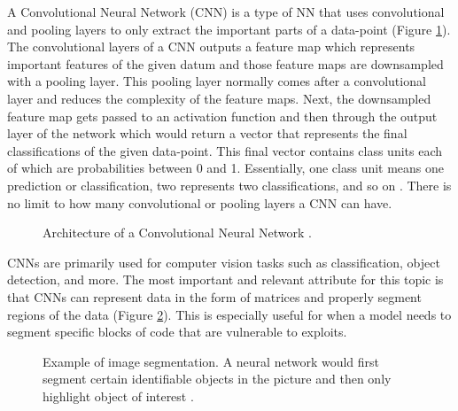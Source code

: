 \documentclass[12pt,twocolumn,letterpaper]{article}
\begin{document}
A Convolutional Neural Network (CNN) is a type of NN that uses convolutional and pooling layers to only 
extract the important parts of a data-point (Figure \ref{fig:dl-2}). The convolutional layers of a CNN outputs a feature map which 
represents important features of the given datum and those feature maps are downsampled with a pooling layer. 
This pooling layer normally comes after a convolutional layer and reduces the complexity of the feature maps. 
Next, the downsampled feature map gets passed to an activation function and then through the output layer of the 
network which would return a vector that represents the final classifications of the given data-point. This final 
vector contains class units each of which are probabilities between 0 and 1. Essentially, one class unit means 
one prediction or classification, two represents two classifications, and so on \cite{Lin20}. There is no 
limit to how many convolutional or pooling layers a CNN can have.

\begin{figure}[h]
    \centering
    \caption{Architecture of a Convolutional Neural Network \cite{Lin20}.}
    \label{fig:dl-2}
\end{figure}

CNNs are primarily used for computer vision tasks such as classification, object detection, and more. 
The most important and relevant attribute for this topic is that CNNs can represent data in the form of 
matrices and properly segment regions of the data (Figure \ref{fig:dl-3}). This is especially useful for when a model needs to segment 
specific blocks of code that are vulnerable to exploits. 

\begin{figure}[h]    
    \centering
    \caption{Example of image segmentation. A neural network would first segment certain identifiable 
    objects in the picture and then only highlight object of interest \cite{Li22}.}    
    \label{fig:dl-3}
\end{figure}
\end{document}
